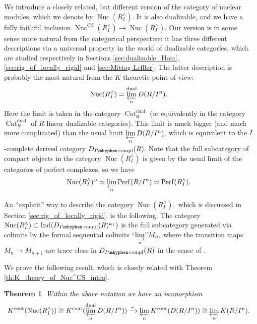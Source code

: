 \documentclass[11pt,leqno]{amsart}
\newtheorem{theo}{Theorem}[section]
\numberwithin{equation}{section}
\newcommand{\hy}{\mhyphen}
\newcommand{\indlim}[1][]{\mathop{\varinjlim}\limits_{#1}}
\newcommand{\inddlim}[1][]{{``{\indlim[#1]}"}}
\newcommand{\prolim}[1][]{\mathop{\varprojlim}\limits_{#1}}
\newcommand{\xto}{\xrightarrow}
\newcommand{\Nuc}{\operatorname{Nuc}}
\newcommand{\Cat}{\operatorname{Cat}}
\newcommand{\cont}{\operatorname{cont}}
\newcommand{\st}{\operatorname{st}}
\newcommand{\dual}{\operatorname{dual}}
\newcommand{\Perf}{\operatorname{Perf}}
\newcommand{\Ind}{\operatorname{Ind}}
\newcommand{\compl}{\operatorname{compl}}
\begin{document}
We introduce a closely related, but different version of the category of nuclear modules, which we denote by $\Nuc(R^{\wedge}_I).$ It is also dualizable, and we have a fully faithful inclusion $\Nuc^{CS}(R^{\wedge}_I)\to \Nuc(R^{\wedge}_I).$ Our version is in some sense more natural from the categorical perspective: it has three different descriptions via a universal property in the world of dualizable categories, which are studied respectively in Sections \ref{sec:dualizable_Hom}, \ref{sec:rig_of_locally_rigid} and \ref{sec:Mittag-Leffler}. The latter description is probably the most natural from the $K$-theoretic point of view:
\begin{equation*}
 	\Nuc(R^{\wedge}_I)=\prolim[n]^{\dual}D(R/I^n).
\end{equation*}
Here the limit is taken in the category $\Cat_{\st}^{\dual}$ (or equivalently in the category $\Cat_R^{\dual}$ of $R$-linear dualizable categories). This limit is much bigger (and much more complicated) than the usual limit $\prolim[n]D(R/I^n),$ which is equivalent to the $I$-complete derived category $D_{I\hy\compl}(R).$ Note that the full subcategory of compact objects in the category $\Nuc(R^{\wedge}_I)$ is given by the usual limit of the categories of perfect complexes, so we have
\begin{equation}\label{eq:Nuc_as_limit_intro}
\Nuc(R^{\wedge}_I)^{\omega}\simeq \prolim[n]\Perf(R/I^n)\simeq \Perf(R^{\wedge}_I).
\end{equation}

An ``explicit'' way to describe the category $\Nuc(R^{\wedge}_I),$ which is discussed in Section \ref{sec:rig_of_locally_rigid}, is the following. The category $\Nuc(R^{\wedge}_I)\subset\Ind(D_{I\hy\compl}(R)^{\omega_1})$ is the full subcategory generated via colimits by the formal sequential colimits $\inddlim[n]M_n,$ where the transition maps $M_n\to M_{n+1}$ are trace-class in $D_{I\hy\compl}(R)$ in the sense of \cite[Definition 13.11]{CS20}. 

We prove the following result, which is closely related with Theorem \ref{th:K_theory_of_Nuc^CS_intro}.

\begin{theo}\label{th:K_theory_of_Nuc_intro}
Within the above notation we have an isomorphism
\begin{equation*}
K^{\cont}(\Nuc(R^{\wedge}_I))\cong K^{\cont}(\prolim[n]^{\dual}D(R/I^n))\xto{\sim} \prolim[n] K^{\cont}(D(R/I^n))\cong \prolim[n]K(R/I^n).
\end{equation*}
\end{theo}
\end{document}
